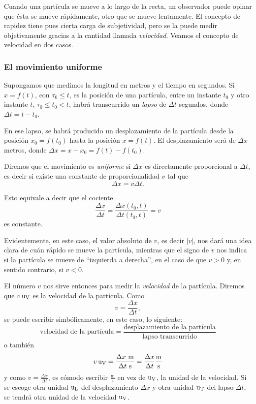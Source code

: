 Cuando una partícula se mueve a lo largo de la recta, un observador puede opinar que ésta se mueve
rápidamente, otro que se mueve lentamente. El concepto de rapidez tiene pues cierta carga de
subjetividad, pero se la puede medir objetivamente gracias a la cantidad llamada \emph{velocidad}.
Veamos el concepto de velocidad en dos casos.

\subsubsection{El movimiento uniforme}

Supongamos que medimos la longitud en metros y el tiempo en segundos. Si $x=f(t)$, con $\tau_0\leq
t$, es la posición de una partícula, entre un instante $t_0$ y otro instante $t$, $\tau_0\leq t_0<
t$, habrá transcurrido un \emph{lapso} de $\Delta t$ segundos, donde $\Delta t= t-t_0$.

En ese lapso, se habrá producido un desplazamiento de la partícula desde la posición $x_0=f(t_0)$
hasta la posición $x=f(t)$. El desplazamiento será de $\Delta x$ metros, donde $\Delta x=
x-x_0=f(t)-f(t_0)$.

\begin{defical}
Diremos que el movimiento es \emph{uniforme} si $\Delta x$ es directamente proporcional a $\Delta
t$, es decir si existe una constante de proporcionalidad $v$ tal que
\begin{equation*}
	\Delta x= v\Delta t.
\end{equation*}
\end{defical}

Esto equivale a decir que el cociente
\begin{equation*}
	\frac{\Delta x}{\Delta t}= \frac{\Delta x(t_0,t)}{\Delta t(t_0,t)} = v
\end{equation*}
es constante.

Evidentemente, en este caso, el valor absoluto de $v$, es decir $|v|$, nos dará una idea clara de
cuán rápido se mueve la partícula, mientras que el signo de $v$ nos indica si la partícula se mueve
de ``izquierda a derecha'', en el caso de que $v>0$ y, en sentido contrario, si $v<0$.

El número $v$ nos sirve entonces para medir la \emph{velocidad} de la partícula. Diremos que $v
\operatorname{u_V}$ es la velocidad de la partícula. Como
\begin{equation*}
	v=\frac{\Delta x}{\Delta t},
\end{equation*}
se puede escribir simbólicamente, en este caso, lo siguiente:
\begin{equation*}
	\text{velocidad de la partícula}=\frac{\text{desplazamiento de la partícula}}{\text{lapso transcurrido}}
\end{equation*}
o también
\begin{equation*}
	v \operatorname{u_V}= \frac{\Delta x\text{ m}}{\Delta t\text{ s}}=\frac{\Delta x}{\Delta t}\frac{\text{m}}{\text{s}}
\end{equation*}
y como $v=\frac{\Delta x}{\Delta t}$, es cómodo escribir $\frac{\text{m}}{\text{s}}$ en vez de
$\operatorname{u_V}$, la unidad de la velocidad. Si se escoge otra unidad $\operatorname{u_L}$ del desplazamiento $\Delta x$ y
otra unidad $\operatorname{u_T}$ del lapso $\Delta t$, se tendrá otra unidad de la velocidad $\operatorname{u_V}$.

